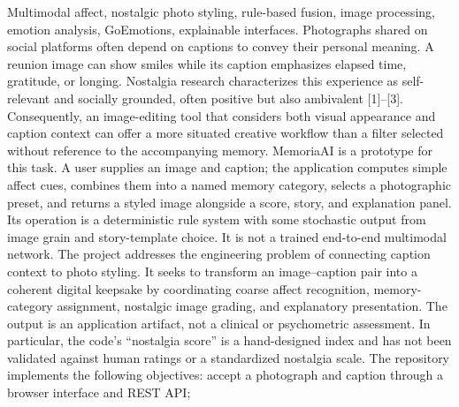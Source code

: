 \documentclass[conference]{IEEEtran}
\begin{document}
\markdownRendererInterblockSeparator
{}Multimodal affect, nostalgic photo styling, rule-based fusion, image processing, emotion analysis, GoEmotions, explainable interfaces.\markdownRendererInterblockSeparator
{}
\markdownRendererSectionEnd \markdownRendererSectionBegin
{}\markdownRendererInterblockSeparator
{}\markdownRendererSectionBegin
{}\markdownRendererInterblockSeparator
{}Photographs shared on social platforms often depend on captions to convey their personal meaning. A reunion image can show smiles while its caption emphasizes elapsed time, gratitude, or longing. Nostalgia research characterizes this experience as self-relevant and socially grounded, often positive but also ambivalent [1]–[3]. Consequently, an image-editing tool that considers both visual appearance and caption context can offer a more situated creative workflow than a filter selected without reference to the accompanying memory.\markdownRendererParagraphSeparator
{}MemoriaAI is a prototype for this task. A user supplies an image and caption; the application computes simple affect cues, combines them into a named memory category, selects a photographic preset, and returns a styled image alongside a score, story, and explanation panel. Its operation is a deterministic rule system with some stochastic output from image grain and story-template choice. It is not a trained end-to-end multimodal network.\markdownRendererInterblockSeparator
{}
\markdownRendererSectionEnd \markdownRendererSectionBegin
{}\markdownRendererInterblockSeparator
{}The project addresses the engineering problem of connecting caption context to photo styling. It seeks to transform an image–caption pair into a coherent digital keepsake by coordinating coarse affect recognition, memory-category assignment, nostalgic image grading, and explanatory presentation. The output is an application artifact, not a clinical or psychometric assessment. In particular, the code’s “nostalgia score” is a hand-designed index and has not been validated against human ratings or a standardized nostalgia scale.\markdownRendererInterblockSeparator
{}
\markdownRendererSectionEnd \markdownRendererSectionBegin
{}\markdownRendererInterblockSeparator
{}The repository implements the following objectives:\markdownRendererInterblockSeparator
{}\markdownRendererOlBeginTight
{}accept a photograph and caption through a browser interface and REST API;\markdownRendererOlItemEnd 
\end{document}
